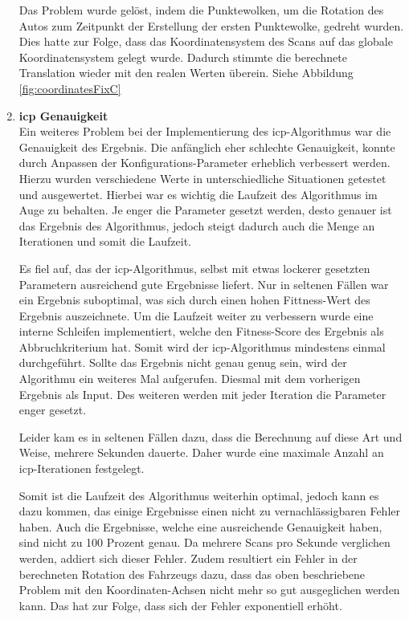 \begin{enumerate}[leftmargin=*]
    Das Problem wurde gelöst, indem die Punktewolken, um die Rotation des Autos zum Zeitpunkt der Erstellung der ersten Punktewolke, gedreht wurden.
    Dies hatte zur Folge, dass das Koordinatensystem des Scans auf das globale Koordinatensystem gelegt wurde.
    Dadurch stimmte die berechnete Translation wieder mit den realen Werten überein. Siehe Abbildung \ref{fig:coordinatesFixC}

    \item \textbf{\ac{icp} Genauigkeit} \\
    Ein weiteres Problem bei der Implementierung des \ac{icp}-Algorithmus war die Genauigkeit des Ergebnis.
    Die anfänglich eher schlechte Genauigkeit, konnte durch Anpassen der Konfigurations-Parameter erheblich verbessert werden.
    Hierzu wurden verschiedene Werte in unterschiedliche Situationen getestet und ausgewertet.
    Hierbei war es wichtig die Laufzeit des Algorithmus im Auge zu behalten.
    Je enger die Parameter gesetzt werden, desto genauer ist das Ergebnis des Algorithmus, jedoch steigt dadurch auch die Menge an Iterationen und somit die Laufzeit.

    Es fiel auf, das der \ac{icp}-Algorithmus, selbst mit etwas lockerer gesetzten Parametern ausreichend gute Ergebnisse liefert.
    Nur in seltenen Fällen war ein Ergebnis suboptimal, was sich durch einen hohen Fittness-Wert des Ergebnis auszeichnete.
    Um die Laufzeit weiter zu verbessern wurde eine interne Schleifen implementiert, welche den Fitness-Score des Ergebnis als Abbruchkriterium hat.
    Somit wird der \ac{icp}-Algorithmus mindestens einmal durchgeführt.
    Sollte das Ergebnis nicht genau genug sein, wird der Algorithmu ein weiteres Mal aufgerufen.
    Diesmal mit dem vorherigen Ergebnis als Input.
    Des weiteren werden mit jeder Iteration die Parameter enger gesetzt.

    Leider kam es in seltenen Fällen dazu, dass die Berechnung auf diese Art und Weise, mehrere Sekunden dauerte.
    Daher wurde eine maximale Anzahl an \ac{icp}-Iterationen festgelegt.

    Somit ist die Laufzeit des Algorithmus weiterhin optimal, jedoch kann es dazu kommen, das einige Ergebnisse einen nicht zu vernachlässigbaren Fehler haben.
    Auch die Ergebnisse, welche eine ausreichende Genauigkeit haben, sind nicht zu 100 Prozent genau.
    Da mehrere Scans pro Sekunde verglichen werden, addiert sich dieser Fehler.
    Zudem resultiert ein Fehler in der berechneten Rotation des Fahrzeugs dazu, dass das oben beschriebene Problem mit den Koordinaten-Achsen nicht mehr so gut ausgeglichen werden kann.
    Das hat zur Folge, dass sich der Fehler exponentiell erhöht.


\end{enumerate}
